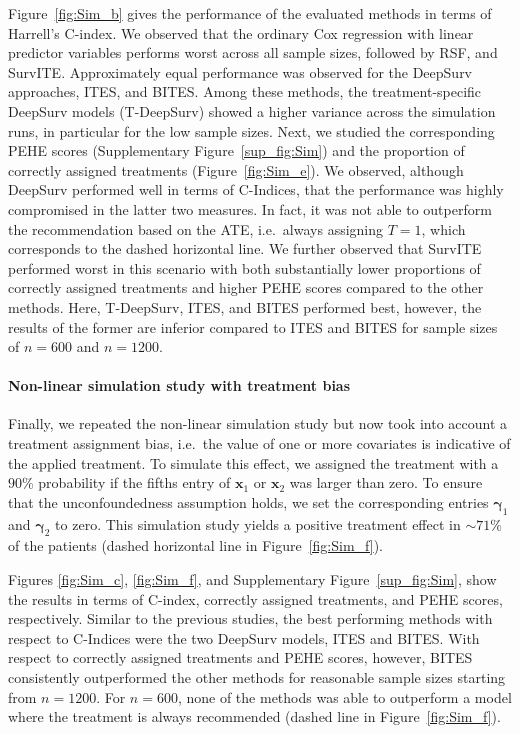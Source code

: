 \documentclass{article}
\newcommand{\myvec}[1]{\boldsymbol{#1}}
\begin{document}
	Figure~\ref{fig:Sim_b} gives the performance of the evaluated methods in terms of Harrell's C-index. We observed that the ordinary Cox regression with linear predictor variables performs worst across all sample sizes, followed by RSF, and SurvITE. Approximately equal performance was observed for the DeepSurv approaches, ITES, and BITES. Among these methods, the treatment-specific DeepSurv models (T-DeepSurv) showed a higher variance across the simulation runs, in particular for the low sample sizes. Next, we studied the corresponding PEHE scores (Supplementary Figure~\ref{sup_fig:Sim}) and the proportion of correctly assigned treatments (Figure~\ref{fig:Sim_e}). We observed, although DeepSurv performed well in terms of C-Indices, that the performance was highly compromised in the latter two measures. In fact, it was not able to outperform the recommendation based on the ATE, i.e.~always assigning $T=1$, which corresponds to the dashed horizontal line. We further observed that SurvITE performed worst in this scenario with both substantially lower proportions of correctly assigned treatments and higher PEHE scores compared to the other methods. Here, T-DeepSurv, ITES, and BITES performed best, however, the results of the former are inferior compared to ITES and BITES for sample sizes of $n=600$ and $n=1200$. 
	
	
	
	
	
	\paragraph{Non-linear simulation study with treatment bias}
	Finally, we repeated the non-linear simulation study but now took into account a treatment assignment bias, i.e.~the value of one or more covariates is indicative of the applied treatment. To simulate this effect, we	 assigned the treatment with a $90\%$ probability if the fifths entry of $\myvec{x}_1$ or $\myvec{x}_2$ was larger than zero. To ensure that the unconfoundedness assumption holds, we set the corresponding entries $\myvec{\gamma}_1$ and $\myvec{\gamma}_2$ to zero. This simulation study yields a positive treatment effect in $\sim71\%$ of the patients (dashed horizontal line in Figure~\ref{fig:Sim_f}).
	
	Figures \ref{fig:Sim_c}, \ref{fig:Sim_f}, and Supplementary Figure~\ref{sup_fig:Sim}, show the results in terms of C-index, correctly assigned treatments, and PEHE scores, respectively. Similar to the previous studies, the best performing methods with respect to C-Indices were the two DeepSurv models, ITES and BITES. With respect to correctly assigned treatments and PEHE scores, however, BITES consistently outperformed the other methods for reasonable sample sizes starting from $n=1200$. For $n=600$, none of the methods was able to outperform a model where the treatment is always recommended (dashed line in Figure~\ref{fig:Sim_f}).  
	
\end{document}
